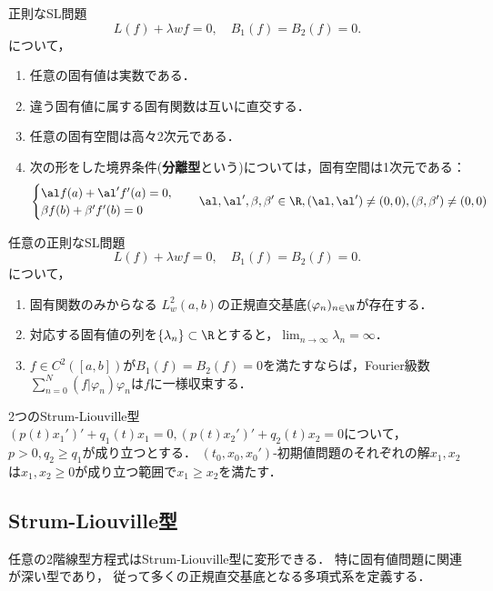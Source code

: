 \documentclass[uplatex,dvipdfmx]{jsreport}
\begin{document}
\begin{theorem}
    正則なSL問題
    \[L(f)+\lambda wf=0,\quad B_1(f)=B_2(f)=0.\]
    について，
    \begin{enumerate}
        \item 任意の固有値は実数である．
        \item 違う固有値に属する固有関数は互いに直交する．
        \item 任意の固有空間は高々2次元である．
        \item 次の形をした境界条件(\textbf{分離型}という)については，固有空間は1次元である：
        \[\begin{cases}
            \al f(a)+\al'f'(a)=0,\\
            \beta f(b)+\beta'f'(b)=0
        \end{cases}\quad\al,\al',\beta,\beta'\in\R,(\al,\al')\ne(0,0),(\beta,\beta')\ne(0,0)\]
    \end{enumerate}
\end{theorem}

\begin{theorem}
    任意の正則なSL問題
    \[L(f)+\lambda wf=0,\quad B_1(f)=B_2(f)=0.\]
    について，
    \begin{enumerate}
        \item 固有関数のみからなる
        $L^2_w(a,b)$の正規直交基底$(\varphi_n)_{n\in\N}$が存在する．
        \item 対応する固有値の列を$\{\lambda_n\}\subset\R$とすると，$\lim_{n\to\infty}\lambda_n=\infty$．
        \item $f\in C^2([a,b])$が$B_1(f)=B_2(f)=0$を満たすならば，Fourier級数$\sum_{n=0}^N(f|\varphi_n)\varphi_n$は$f$に一様収束する．
    \end{enumerate}
\end{theorem}

\begin{theorem}[Strumの比較原理]
    2つのStrum-Liouville型$(p(t)x_1')'+q_1(t)x_1=0,(p(t)x_2')'+q_2(t)x_2=0$について，
    $p>0,q_2\ge q_1$が成り立つとする．
    $(t_0,x_0,x_0')$-初期値問題のそれぞれの解$x_1,x_2$は$x_1,x_2\ge0$が成り立つ範囲で$x_1\ge x_2$を満たす．
\end{theorem}

\subsection{Strum-Liouville型}

\begin{tcolorbox}[colframe=ForestGreen, colback=ForestGreen!10!white,breakable,colbacktitle=ForestGreen!40!white,coltitle=black,fonttitle=\bfseries\sffamily,
title=]
    任意の2階線型方程式はStrum-Liouville型に変形できる．
    特に固有値問題に関連が深い型であり，
    従って多くの正規直交基底となる多項式系を定義する．
\end{tcolorbox}
\end{document}
